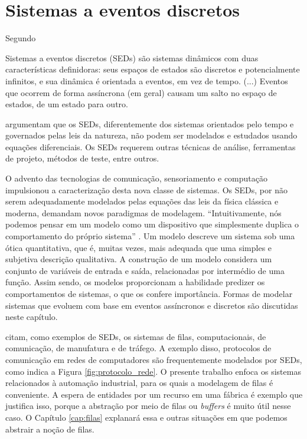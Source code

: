 \chapter{Sistemas a eventos discretos}
\label{cap:seds}

Segundo  \begin{citacao} Sistemas a eventos discretos (\acs{SED}s) são sistemas dinâmicos com duas características definidoras: seus espaços de estados são discretos e potencialmente infinitos, e sua dinâmica é orientada a eventos, em vez de tempo. (...) Eventos que ocorrem de forma assíncrona (em geral) causam um salto no espaço de estados, de um estado para outro. \end{citacao}  argumentam que os SEDs, diferentemente dos sistemas orientados pelo tempo e governados pelas leis da natureza, não podem ser modelados e estudados usando equações diferenciais. Os SEDs requerem outras técnicas de análise, ferramentas de projeto, métodos de teste, entre outros.

O advento das tecnologias de comunicação, sensoriamento e computação impulsionou a caracterização desta nova classe de sistemas. Os SEDs, por não serem adequadamente modelados pelas equações das leis da física clássica e moderna, demandam novos paradigmas de modelagem. ``Intuitivamente, nós podemos pensar em um modelo como um dispositivo que simplesmente duplica o comportamento do próprio sistema'' \cite[p. 3, tradução do autor]{cassandras}. Um modelo descreve um sistema sob uma ótica quantitativa, que é, muitas vezes, mais adequada que uma simples e subjetiva descrição qualitativa. A construção de um modelo considera um conjunto de variáveis de entrada e saída, relacionadas por intermédio de uma função. Assim sendo, os modelos proporcionam a habilidade predizer os comportamentos de sistemas, o que os confere importância. Formas de modelar sistemas que evoluem com base em eventos assíncronos e discretos são discutidas neste capítulo.

 citam, como exemplos de SEDs, os sistemas de filas, computacionais, de comunicação, de manufatura e de tráfego. A exemplo disso, protocolos de comunicação em redes de computadores são frequentemente modelados por SEDs, como indica a Figura \ref{fig:protocolo_rede}. O presente trabalho enfoca os sistemas relacionados à automação industrial, para os quais a modelagem de filas é conveniente. A espera de entidades por um recurso em uma fábrica é exemplo que justifica isso, porque a abstração por meio de filas ou \textit{buffers} é muito útil nesse caso. O Capítulo \ref{cap:filas} explanará essa e outras situações em que podemos abstrair a noção de filas.

